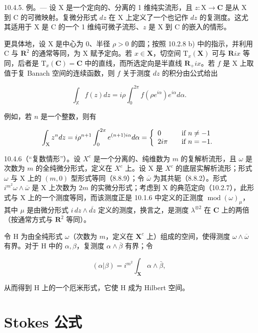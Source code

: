 10.4.5. 例。--- 设 X 是一个定向的、分离的 1 维纯实流形，且 \(z: \mathrm{X} \to \mathbf{C}\) 是从 X 到 C 的可微映射。复微分形式 \(dz\) 在 X 上定义了一个也记作 \(dz\) 的复测度。这尤其适用于 X 是 C 的一个 1 维纯可微子流形、\(z\) 是 X 到 C 的嵌入的情形。

更具体地，设 X 是中心为 0、半径 \(\rho > 0\) 的圆；按照 10.2.8 b) 中的指示，并利用 C 与 \(\mathbf{R}^2\) 的通常等同，为 X 赋予定向。若 \(x \in \mathbf{X}\)，切空间 \(\mathrm{T}_x(\mathbf{X})\) 可与 \(\mathbf{R}ix\) 等同，后者是 \(\mathrm{T}_x(\mathbf{C}) = \mathbf{C}\) 中的直线，而所选定向是半直线 \(\mathbf{R}_+ix\)。若 \(f\) 是 X 上取值于复 Banach 空间的连续函数，则 \(f\) 关于测度 \(dz\) 的积分由公式给出

\[
\int_ {\mathbb {X}} f (z) d z = i \rho \int_ {0} ^ {2 \pi} f (\rho e ^ {i \alpha}) e ^ {i \alpha} d \alpha .
\]

例如，若 \(n\) 是一个整数，则有

\[
\int_ {\mathrm{X}} z ^ {n} d z = i \rho^ {n + 1} \int_ {0} ^ {2 \pi} e ^ {(n + 1) i \alpha} d \alpha = \left\{ \begin{array}{l l} 0 & \quad \text {if } n \neq - 1 \\ 2 i \pi & \quad \text {if } n = - 1. \end{array} \right.
\]

10.4.6（“复数情形”）。设 \(X^{c}\) 是一个分离的、纯维数为 \(m\) 的复解析流形，且 \(\omega\) 是次数为 \(m\) 的全纯微分形式，定义在 \(X^{c}\) 上。设 X 是 \(X^{c}\) 的底层实解析流形；形式 \(\omega\) 与 X 上的 \((m,0)\) 型形式等同（8.8.9）；令 \(\overline{\omega}\) 为其共轭（8.8.2）。形式 \(i^{m^{2}}\omega \wedge \overline{\omega}\) 是 X 上次数为 \(2m\) 的实微分形式；考虑到 X 的典范定向（10.2.7），此形式与 X 上的一个测度等同，而该测度正是 10.1.6 中定义的正测度 \(\operatorname{mod}(\omega)_{\mu}\)，其中 \(\mu\) 是由微分形式 \(i \, dz \wedge \overline{dz}\) 定义的测度，换言之，是测度 \(\lambda^{\otimes 2}\) 在 \(\mathbf{C}\) 上的两倍（按通常方式与 \(\mathbf{R}^{2}\) 等同）。

令 H 为由全纯形式 \(\omega\)（次数为 \(m\)，定义在 \(\mathbf{X}^c\) 上）组成的空间，使得测度 \(\omega \wedge \overline{\omega}\) 有界。对于 H 中的 \(\alpha, \beta\)，复测度 \(\alpha \wedge \overline{\beta}\) 有界；令

\[
(\alpha | \beta) = i ^ {m ^ {2}} \int_ {\mathbf {X}} \alpha \wedge \bar {\beta},
\]

从而得到 H 上的一个厄米形式，它使 H 成为 Hilbert 空间。

\section{Stokes 公式}

